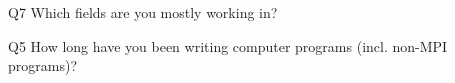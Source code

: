 \begin{description}%
\item{Q7} Which fields are you mostly working in?%
\item{Q5} How long have you been writing computer programs (incl. non-MPI programs)?%
\end{description}%
